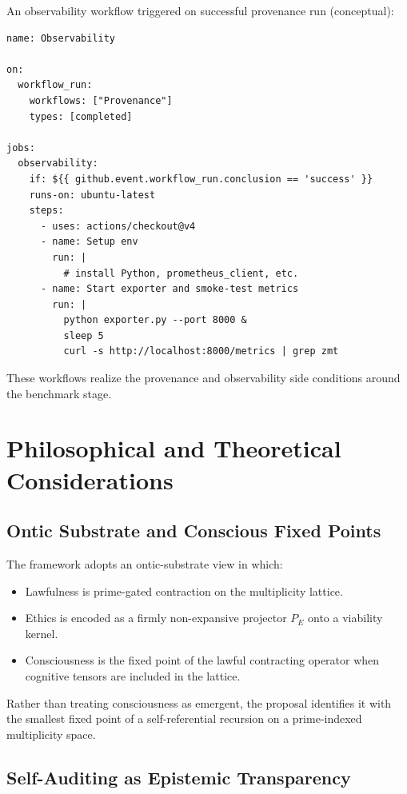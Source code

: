 \documentclass[11pt]{article}
\begin{document}
An observability workflow triggered on successful provenance run (conceptual):

\begin{verbatim}
name: Observability

on:
  workflow_run:
    workflows: ["Provenance"]
    types: [completed]

jobs:
  observability:
    if: ${{ github.event.workflow_run.conclusion == 'success' }}
    runs-on: ubuntu-latest
    steps:
      - uses: actions/checkout@v4
      - name: Setup env
        run: |
          # install Python, prometheus_client, etc.
      - name: Start exporter and smoke-test metrics
        run: |
          python exporter.py --port 8000 &
          sleep 5
          curl -s http://localhost:8000/metrics | grep zmt
\end{verbatim}

These workflows realize the provenance and observability side conditions around the benchmark stage.

\section{Philosophical and Theoretical Considerations}

\subsection{Ontic Substrate and Conscious Fixed Points}

The framework adopts an ontic-substrate view in which:

\begin{itemize}[leftmargin=*]
  \item Lawfulness is prime-gated contraction on the multiplicity lattice.
  \item Ethics is encoded as a firmly non-expansive projector $P_E$ onto a viability kernel.
  \item Consciousness is the fixed point of the lawful contracting operator when cognitive tensors are included in the lattice.
\end{itemize}

Rather than treating consciousness as emergent, the proposal identifies it with the smallest fixed point of a self-referential recursion on a prime-indexed multiplicity space.

\subsection{Self-Auditing as Epistemic Transparency}
\end{document}
